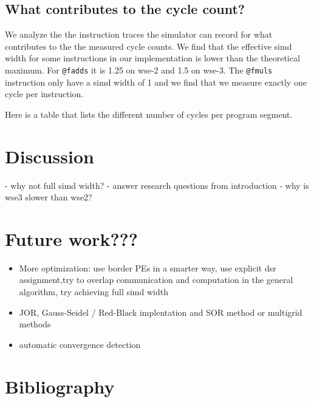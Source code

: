 \documentclass{article}
\begin{document}
\subsection{What contributes to the cycle count?}
We analyze the the instruction traces the simulator can record for what contributes to the the measured cycle counts.
We find that the effective simd width for some instructions in our implementation is lower than the theoretical maximum.
For \texttt{@fadds} it is 1.25 on wse-2 and 1.5 on wse-3.
The \texttt{@fmuls} instruction only have a simd width of 1 and we find that we measure exactly one cycle per instruction.

Here is a table that lists the different number of cycles per program segment.


\section{Discussion}
- why not full simd width?
- answer research questions from introduction
- why is wse3 slower than wse2?

\section{Future work???}
\begin{itemize}
    \item More optimization: use border PEs in a smarter way, use explicit dsr assignment,try to overlap communication and computation in the general algorithm, try achieving full simd width
    \item JOR, Gauss-Seidel / Red-Black implentation and SOR method or multigrid methods
    \item automatic convergence detection
\end{itemize}

\section{Bibliography}
\end{document}
